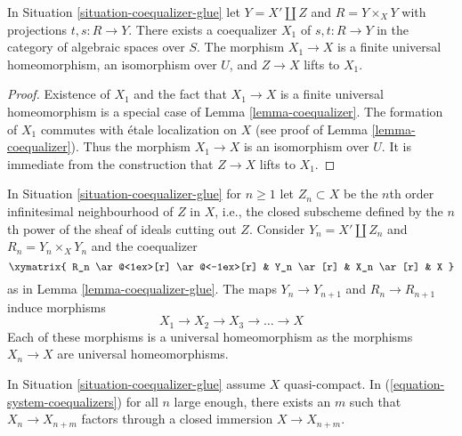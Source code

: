 \begin{lemma}
\label{lemma-coequalizer-glue}
In Situation \ref{situation-coequalizer-glue} let $Y = X' \amalg Z$ and
$R = Y \times_X Y$ with projections $t, s : R \to Y$. There exists a
coequalizer $X_1$ of $s, t : R \to Y$ in the category of algebraic spaces
over $S$. The morphism $X_1 \to X$ is a finite universal homeomorphism,
an isomorphism over $U$, and $Z \to X$ lifts to $X_1$.
\end{lemma}

\begin{proof}
Existence of $X_1$ and the fact that $X_1 \to X$ is a finite
universal homeomorphism is a special case of Lemma \ref{lemma-coequalizer}.
The formation of $X_1$ commutes with \'etale localization on $X$
(see proof of Lemma \ref{lemma-coequalizer}).
Thus the morphism $X_1 \to X$ is an isomorphism over $U$.
It is immediate from the construction that $Z \to X$ lifts to $X_1$.
\end{proof}

\noindent
In Situation \ref{situation-coequalizer-glue} for $n \geq 1$ let
$Z_n \subset X$ be the $n$th order infinitesimal neighbourhood
of $Z$ in $X$, i.e., the closed subscheme defined by the $n$th
power of the sheaf of ideals cutting out $Z$. Consider $Y_n = X' \amalg Z_n$
and $R_n = Y_n \times_X Y_n$ and the coequalizer
$$
\xymatrix{
R_n \ar@<1ex>[r] \ar@<-1ex>[r] & Y_n \ar[r] & X_n \ar[r] & X
}
$$
as in Lemma \ref{lemma-coequalizer-glue}. The maps $Y_n \to Y_{n + 1}$
and $R_n \to R_{n + 1}$ induce morphisms
\begin{equation}
\label{equation-system-coequalizers}
X_1 \to X_2 \to X_3 \to \ldots \to X
\end{equation}
Each of these morphisms is a universal homeomorphism as the morphisms
$X_n \to X$ are universal homeomorphisms.

\begin{lemma}
\label{lemma-essentially-constant}
In Situation \ref{situation-coequalizer-glue} assume $X$ quasi-compact.
In (\ref{equation-system-coequalizers}) for all $n$ large enough, there
exists an $m$ such that $X_n \to X_{n + m}$ factors through a
closed immersion $X \to X_{n + m}$.
\end{lemma}

